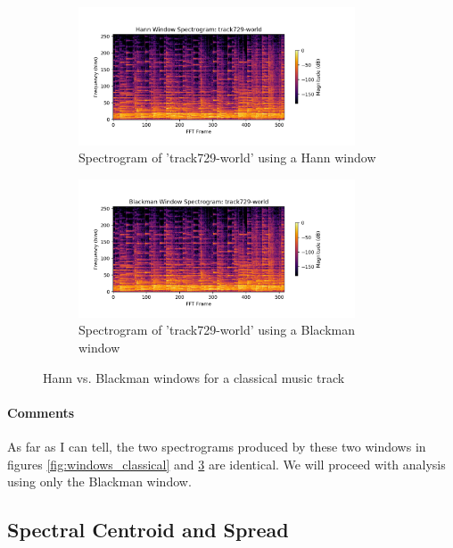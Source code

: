 \documentclass[11pt,a4paper]{article}
\begin{document}
\begin{figure}[tb]
	\centering
	\begin{subfigure}[t]{\hsize}
		\centering
		\includegraphics[width=0.9\textwidth]{powerHann_track729-world}
		\caption{Spectrogram of 'track729-world' using a Hann window}
		\label{fig:hann_world}
	\end{subfigure}
	\begin{subfigure}[t]{\hsize}
		\centering
		\includegraphics[width=0.9\textwidth]{powerBlack_track729-world}
		\caption{Spectrogram of 'track729-world' using a Blackman window}
		\label{fig:black_world}
	\end{subfigure}
	\caption{Hann vs. Blackman windows for a classical music track}
	\label{fig:windows_world}
\end{figure}
\clearpage

\paragraph{Comments} As far as I can tell, the two spectrograms produced by these two windows in figures \ref{fig:windows_classical} and \ref{fig:windows_world} are identical. We will proceed with analysis using only the Blackman window.

\subsection{Spectral Centroid and Spread}
\end{document}
